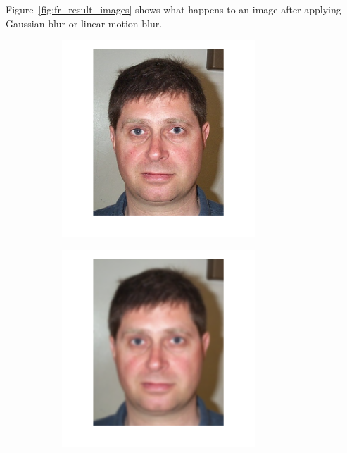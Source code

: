 Figure~\ref{fig:fr_result_images} shows what happens to an image after applying Gaussian blur or linear motion blur.

\begin{figure}[H]
\centering
\begin{subfigure}{.30\textwidth}
  \centering
  \includegraphics[width=0.8\textwidth]{img/blur_test/orig_img.png}
  \caption{}
\end{subfigure}%
\begin{subfigure}{.30\textwidth}
  \centering
  \includegraphics[width=0.8\textwidth]{img/blur_test/gauss_img.png}

\end{subfigure}
\end{figure}
